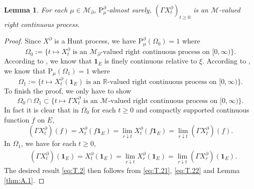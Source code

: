 \documentclass[12pt,a4paper]{amsart}
\numberwithin{equation}{section}
\theoremstyle{plain}
\newtheorem{lem}[thm]{Lemma}
\theoremstyle{definition}
\theoremstyle{remark}
\begin{document}
\begin{lem} \label{thm:T.2}
	For each $\mu \in \mathcal M_\partial$, $\mathrm P_\mu^\partial$-almost surely, $(\Gamma X^\partial_t)_{t\geq 0}$ is an $\mathcal M$-valued right continuous process.
\end{lem}
\begin{proof}
	Since $X^\partial$ is a Hunt process, we have $\mathrm P_\mu^\partial(\Omega_0) = 1$ where
\[
	\Omega_0 := \{t\mapsto X_t^\partial \text{ is an $\mathcal M_\partial$-valued right continuous process on $[0,\infty)$}\}.
\]
	According to \cite[Theorem A.20]{Li2011Measure-valued}, we know that $\mathbf 1_E$ is finely continuous relative to $\xi$.
	According to \cite[Proposition 5.9]{Li2011Measure-valued}, we know that
$
	\mathrm P_\mu(\Omega_1) = 1
$
	where
\[
	\Omega_1 := \{t \mapsto X_t^\partial(\mathbf 1_E) \text{ is an $\mathbb R$-valued right continuous process on $[0,\infty)$}\}.
\]
	To finish the proof, we only have to show
\begin{equation} \label{eq:T.2}
	\Omega_0\cap \Omega_1
	\subset \{t\mapsto \Gamma X_t^\partial \text{ is an $\mathcal M$-valued right continuous process on $[0,\infty)$}\}.
\end{equation}
	In fact it is clear that in $\Omega_0$ for each $t\geq 0$ and compactly supported continuous function $f$ on $E$,
\begin{equation}\label{eq:T.21}
	(\Gamma X^\partial_t)(f) = X^\partial_t(f\mathbf 1_E) = \lim_{r\downarrow t} X^\partial_t(f\mathbf 1_E) = \lim_{r\downarrow t} (\Gamma X^\partial_t)(f).
\end{equation}
	In $\Omega_1$, we have for each $t\geq 0$,
\begin{align} \label{eq:T.22}
	&(\Gamma X^\partial_t)(\mathbf 1_E)
	= X^\partial_t(\mathbf 1_E)
	= \lim_{r\downarrow t} X^\partial_r (\mathbf 1_{E})
	= \lim_{r\downarrow t} (\Gamma X^\partial_r)(\mathbf 1_E).
\end{align}
	The desired result \eqref{eq:T.2} then follows from \eqref{eq:T.21}, \eqref{eq:T.22} and Lemma \ref{thm:A.1}.
\end{proof}
\end{document}
